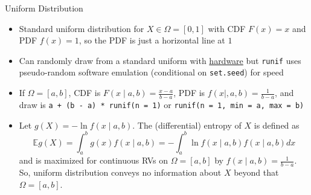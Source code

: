 \documentclass[
  ignorenonframetext,
]{beamer}
\providecommand{\tightlist}{%
  \setlength{\itemsep}{0pt}\setlength{\parskip}{0pt}}
\begin{document}
\begin{frame}[fragile]{Uniform Distribution}
\protect\hypertarget{uniform-distribution}{}
\begin{itemize}
\tightlist
\item
  Standard uniform distribution for \(X \in \Omega = \left[0,1\right]\)
  with CDF \(F\left(x\right) = x\) and PDF \(f\left(x\right) = 1\), so
  the PDF is just a horizontal line at \(1\)
\item
  Can randomly draw from a standard uniform with
  \href{https://en.wikipedia.org/wiki/RDRAND}{hardware} but
  \texttt{runif} uses pseudo-random software emulation (conditional on
  \texttt{set.seed}) for speed
\item
  If \(\Omega = \left[a,b\right]\), CDF is
  \(F\left(x \mid a,b\right) = \frac{x - a}{b - a}\), PDF is
  \(f\left(x \mid, a,b\right) = \frac{1}{b - a}\), and draw is
  \texttt{a\ +\ (b\ -\ a)\ *\ runif(n\ =\ 1)} or
  \texttt{runif(n\ =\ 1,\ min\ =\ a,\ max\ =\ b)}
\item
  Let \(g\left(X\right) = -\ln f\left(x \mid a,b\right)\). The
  (differential) entropy of \(X\) is defined as
  \[\mathbb{E}g\left(X\right) = \int_a^b g\left(x\right) f\left(x \mid a, b\right) = 
  -\int_a^b \ln f\left(x \mid a,b\right) f\left(x \mid a,b\right) dx\]
  and is maximized for continuous RVs on \(\Omega = \left[a,b\right]\)
  by \(f\left(x \mid a,b\right) = \frac{1}{b - a}\). So, uniform
  distribution conveys no information about \(X\) beyond that
  \(\Omega = \left[a,b\right]\).
\end{itemize}
\end{frame}
\end{document}
